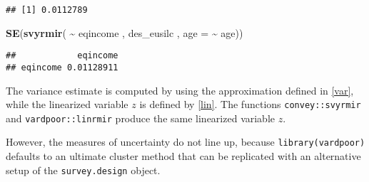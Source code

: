 \documentclass[
]{book}
\newenvironment{Shaded}{\begin{snugshade}}{\end{snugshade}}
\newcommand{\AttributeTok}[1]{\textcolor[rgb]{0.13,0.29,0.53}{#1}}
\newcommand{\FunctionTok}[1]{\textcolor[rgb]{0.13,0.29,0.53}{\textbf{#1}}}
\newcommand{\NormalTok}[1]{#1}
\newcommand{\SpecialCharTok}[1]{\textcolor[rgb]{0.81,0.36,0.00}{\textbf{#1}}}
\begin{document}
\begin{verbatim}
## [1] 0.0112789
\end{verbatim}

\begin{Shaded}
\begin{Highlighting}[]
\FunctionTok{SE}\NormalTok{(}\FunctionTok{svyrmir}\NormalTok{( }\SpecialCharTok{\textasciitilde{}}\NormalTok{ eqincome , des\_eusilc , }\AttributeTok{age =} \SpecialCharTok{\textasciitilde{}}\NormalTok{ age)) }
\end{Highlighting}
\end{Shaded}

\begin{verbatim}
##            eqincome
## eqincome 0.01128911
\end{verbatim}

The variance estimate is computed by using the approximation defined in \ref{var}, while the linearized variable \(z\) is defined by \ref{lin}. The functions \texttt{convey::svyrmir} and \texttt{vardpoor::linrmir} produce the same linearized variable \(z\).

However, the measures of uncertainty do not line up, because \texttt{library(vardpoor)} defaults to an ultimate cluster method that can be replicated with an alternative setup of the \texttt{survey.design} object.
\end{document}
